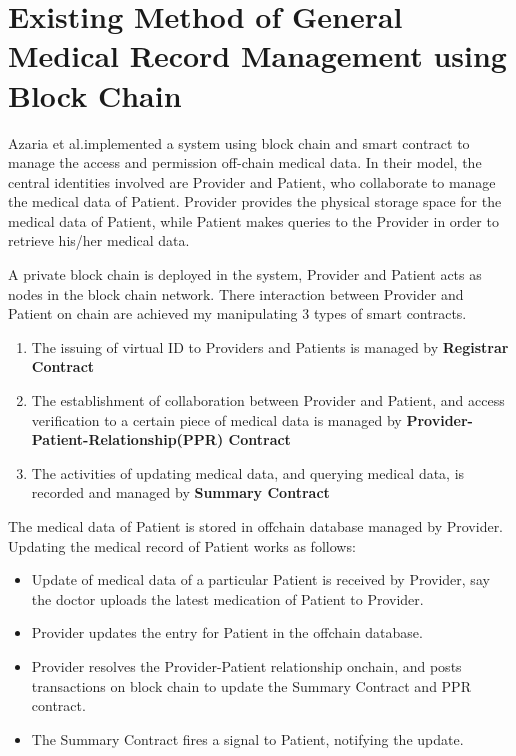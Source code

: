 \documentclass[]{scrartcl}
\begin{document}
\section{Existing Method of General Medical Record Management using Block Chain}
Azaria et al.\cite{MedRecWhitePaper}implemented a system using block chain and smart contract to manage the access and permission off-chain medical data. In their model, the central identities involved are Provider and Patient, who collaborate to manage the medical data of Patient. Provider provides the physical storage space for the medical data of Patient, while Patient makes queries to the Provider in order to retrieve his/her medical data. 

A private block chain is deployed in the system, Provider and Patient acts as nodes in the block chain network. There interaction between Provider and Patient on chain are achieved my manipulating 3 types of smart contracts. 

\begin{enumerate}
\item The issuing of virtual ID to Providers and Patients is managed by \textbf{Registrar Contract}

\item The establishment of collaboration between Provider and Patient, and access verification to a certain piece of medical data is managed by \textbf{Provider-Patient-Relationship(PPR) Contract}

\item The activities of updating medical data, and querying medical data, is recorded and managed by \textbf{Summary Contract}
\end{enumerate}

The medical data of Patient is stored in offchain database managed by Provider.
Updating the medical record of Patient works as follows:
\begin{itemize}
\item Update of medical data of a particular Patient is received by Provider, say the doctor uploads the latest medication of Patient to Provider.

\item Provider updates the entry for  Patient in the offchain database.

\item Provider resolves the Provider-Patient relationship onchain, and posts transactions on block chain to update the Summary Contract and PPR contract.

\item The Summary Contract fires a signal to Patient, notifying the update.
\end{itemize}
\end{document}
